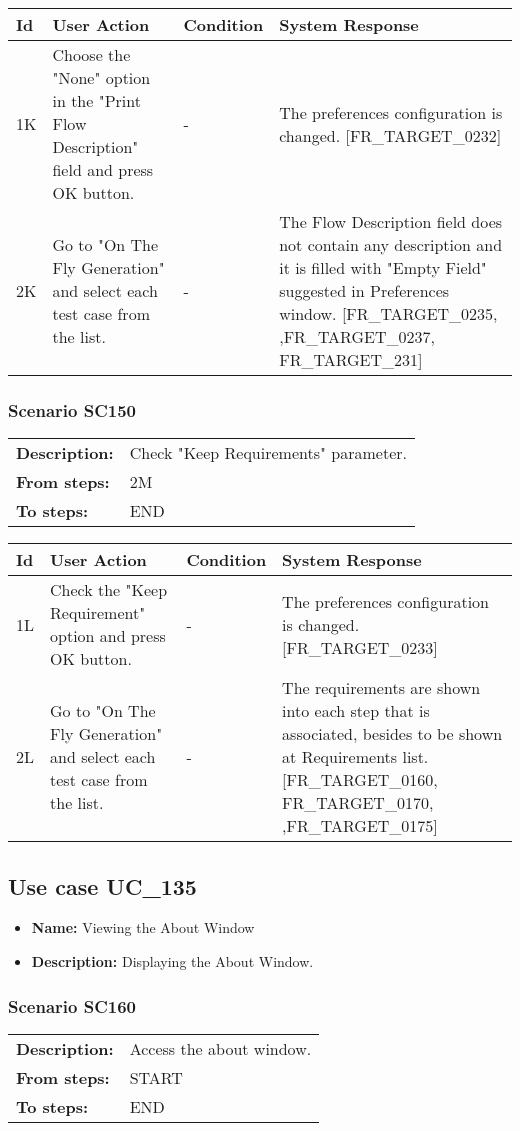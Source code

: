 \documentclass[a4paper,11pt]{article}
\newcommand{\bl}{\\ \hline}
\begin{document}
\begin{tabular}{|p{0.8in}|p{1.6in}|p{1.6in}|p{1.6in}|}
\hline
Id & User Action & Condition & System Response  \bl 
1K & Choose the "None" option in the "Print Flow Description"
						field and press OK button. & - & The preferences configuration is changed.
						[FR_TARGET_0232] \bl 
2K & Go to "On The Fly Generation" and select each test case
						from the list. & - & The Flow Description field does not contain any
						description and it is filled with "Empty Field" suggested in
						Preferences window. [FR_TARGET_0235, ,FR_TARGET_0237,
						FR_TARGET_231] \bl 
\end{tabular}
\subsubsection*{Scenario SC150}
\begin{tabular}{p{1in}p{4in}}
{\bf Description:} & Check "Keep Requirements" parameter. \\
{\bf From steps:} & 2M \\
{\bf To steps:} & END \\
\end{tabular}
 
\begin{tabular}{|p{0.8in}|p{1.6in}|p{1.6in}|p{1.6in}|}
\hline
Id & User Action & Condition & System Response  \bl 
1L & Check the "Keep Requirement" option and press OK button.
					 & - & The preferences configuration is changed.[FR_TARGET_0233]
					 \bl 
2L & Go to "On The Fly Generation" and select each test case
						from the list. & - & The requirements are shown into each step that is
						associated, besides to be shown at Requirements list.
						[FR_TARGET_0160, FR_TARGET_0170, ,FR_TARGET_0175] \bl 
\end{tabular}
\subsection*{Use case UC_135}
\begin{itemize}
\item {\bf Name: }Viewing the About Window
\item {\bf Description: }Displaying the About Window.
\end{itemize}
\subsubsection*{Scenario SC160}
\begin{tabular}{p{1in}p{4in}}
{\bf Description:} & Access the about window. \\
{\bf From steps:} & START \\
{\bf To steps:} & END \\
\end{tabular}
 
\end{document}
